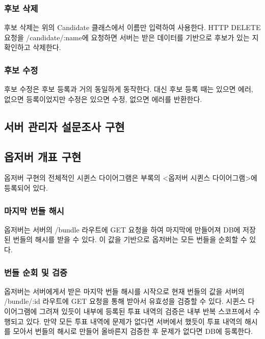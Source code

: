 \documentclass[8pt,a4paper,left=8mm,right=8mm,top=10mm,bottom=10mm]{article}
\begin{document}
    \subsubsection{후보 삭제}

    후보 삭제는 위의 Candidate 클래스에서 이름만 입력하여 사용한다. HTTP DELETE 요청을 /candidate/:name에 요청하면 서버는 받은 데이터를 기반으로 후보가 있는 지 확인하고 삭제한다.

    \subsubsection{후보 수정}

    후보 수정은 후보 등록과 거의 동일하게 동작한다. 대신 후보 등록 때는 있으면 에러, 없으면 등록이었지만 수정은 있으면 수정, 없으면 에러를 반환한다.

\subsection{서버 관리자 설문조사 구현}

\subsection{옵저버 개표 구현}

    옵저버 구현의 전체적인 시퀸스 다이어그램은 부록의 <옵저버 시퀸스 다이어그램>에 등록되어 있다. 

    \subsubsection{마지막 번들 해시}

    옵저버는 서버의 /bundle 라우트에 GET 요청을 하여 마지막에 만들어져 DB에 저장된 번들의 해시를 받을 수 있다. 이 값을 기반으로 옵저버는 모든 번들을 순회할 수 있다.

    \subsubsection{번들 순회 및 검증}

    옵저버는 서버에게서 받은 마지막 번들 해시를 시작으로 현재 번들의 값을 서버의 /bundle/:id 라우트에 GET 요청을 통해 받아서 유효성을 검증할 수 있다. 시퀸스 다이어그램에 그려져 있듯이 내부에 등록된 투표 내역의 검증은 내부 반복 스코프에서 수행되고 있다. 만약 모든 투표 내역에 문제가 없다면 서버에서 했듯이 투표 내역의 해시를 모아서 번들의 해시로 만들어 올바른지 검증한 후 문제가 없다면 DB에 등록한다.
\end{document}
